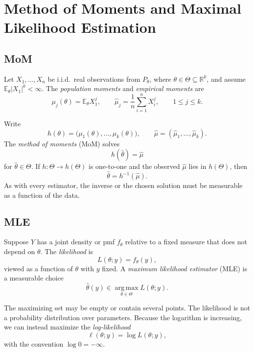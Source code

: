 \section{Method of Moments and Maximal Likelihood Estimation}

\subsection{MoM}

\begin{definition}
Let $X_1,\ldots,X_n$ be i.i.d.\ real observations from $P_\theta$,
where $\theta\in\Theta\subseteq\mathbb{R}^k$, and assume
$\mathbb{E}_\theta|X_1|^k<\infty$.
The \emph{population moments} and \emph{empirical moments} are
\[
\mu_j(\theta)=\mathbb{E}_\theta X_1^j,
\qquad
\widehat\mu_j=\frac{1}{n}\sum_{i=1}^n X_i^j,
\qquad 1\leq j\leq k.
\]

Write
\[
h(\theta)=\bigl(\mu_1(\theta),\ldots,\mu_k(\theta)\bigr),
\qquad
\widehat\mu=(\widehat\mu_1,\ldots,\widehat\mu_k).
\]
The \emph{method of moments} (MoM) solves
\[
h(\widehat\theta)=\widehat\mu
\]
for $\widehat\theta\in\Theta$. If $h:\Theta\to h(\Theta)$ is
one-to-one and the observed $\widehat\mu$ lies in $h(\Theta)$, then
\[
\widehat\theta=h^{-1}(\widehat\mu).
\]
As with every estimator, the inverse or the chosen solution must
be measurable as a function of the data.
\end{definition}

\subsection{MLE}

\begin{definition}
Suppose $Y$ has a joint density or pmf $f_\theta$ relative to a
fixed measure that does not depend on $\theta$.
The \emph{likelihood} is
\[
L(\theta;y)=f_\theta(y),
\]
viewed as a function of $\theta$ with $y$ fixed.
A \emph{maximum likelihood estimator} (MLE) is a measurable choice
\[
\widehat\theta(y)
\in\operatorname*{arg\,max}_{\theta\in\Theta}L(\theta;y).
\]

The maximizing set may be empty or contain several points.
The likelihood is not a probability distribution over parameters.
Because the logarithm is increasing, we can instead maximize
the \emph{log-likelihood}
\[
\ell(\theta;y)=\log L(\theta;y),
\]
with the convention $\log 0=-\infty$.
\end{definition}
